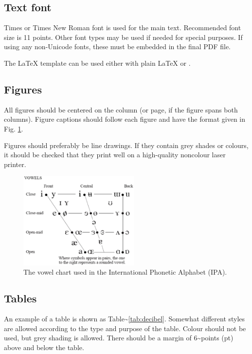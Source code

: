 \documentclass[
  a4paper,
  11pt,
  twocolumn]{article}
\begin{document}
\subsection{Text font}

Times or Times New Roman font is used for the main text. Recommended
font size is 11 points. Other font types may be used if needed for
special purposes. If using any non-Unicode fonts, these must be embedded
in the final PDF file.

The \LaTeX{} template can be used either with plain \LaTeX{} or
\XeLaTeX.

\subsection{Figures}

All figures should be centered on the column (or page, if the figure
spans both columns). Figure captions should follow each figure and have
the format given in Fig. \ref{fig:vowels}.

Figures should preferably be line drawings. If they contain grey shades
or colours, it should be checked that they print well on a high-quality
noncolour laser printer.

\begin{figure}[!ht]
\begin{center}
\includegraphics[width=6cm]{./includes/figures/ipa.eps}
\caption{The vowel chart used in the International Phonetic
Alphabet (IPA).}\label{fig:vowels}
\end{center}
\end{figure}

\subsection{Tables}

An example of a table is shown as
Table\textasciitilde{}\ref{tab:decibel}. Somewhat different styles are
allowed according to the type and purpose of the table. Colour should
not be used, but grey shading is allowed. There should be a margin of
6\textasciitilde points (pt) above and below the table.
\end{document}

